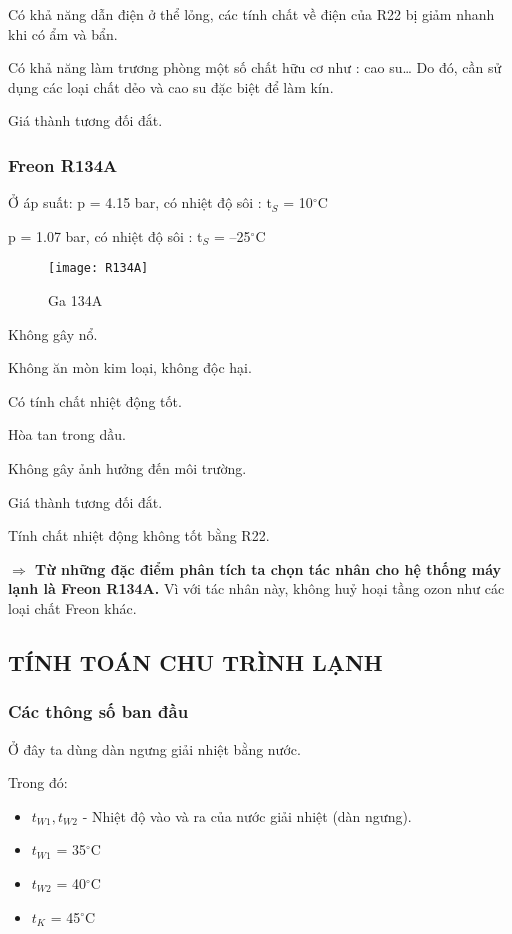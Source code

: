 Có khả năng dẫn điện ở thể lỏng, các tính chất về điện của R22 bị giảm nhanh khi có ẩm và bẩn.

Có khả năng làm trương phòng một số chất hữu cơ như : cao su… Do đó, cần sử dụng các loại chất dẻo và cao su đặc biệt để làm kín.

Giá thành tương đối đắt.

\subsubsection{Freon R134A}
Ở áp suất: 
\hspace{1cm}
p = 4.15 bar, có nhiệt độ sôi : t$_{S}$ = 10$^{\circ}$C

\hspace{2.95cm}
p = 1.07 bar, có nhiệt độ sôi : t$_{S}$ = –25$^{\circ}$C
\begin{figure}[H]
	\centering
	\texttt{[image: R134A]}
	\caption{Ga 134A}
\end{figure}

Không gây nổ.

Không ăn mòn kim loại, không độc hại.

Có tính chất nhiệt động tốt.

Hòa tan trong dầu.

Không gây ảnh hưởng đến môi trường.

Giá thành tương đối đắt.

Tính chất nhiệt động không tốt bằng R22.

\textbf{$\Rightarrow$ Từ những đặc điểm phân tích ta chọn tác nhân cho hệ thống máy lạnh là Freon R134A.} Vì với tác nhân này, không huỷ hoại tầng ozon như các loại chất Freon khác.

\subsection{TÍNH TOÁN CHU TRÌNH LẠNH}
\subsubsection{Các thông số ban đầu}
Ở đây ta dùng dàn ngưng giải nhiệt bằng nước.

Trong đó:
\begin{itemize}
	\item $t_{W1}, t_{W2}$ - Nhiệt độ vào và ra của nước giải nhiệt (dàn ngưng).
	\item $t_{W1}$ = 35$^{\circ}$C
	\item $t_{W2}$ = 40$^{\circ}$C
	\item $t_{K}$ = 45$^{\circ}$C
\end{itemize}

